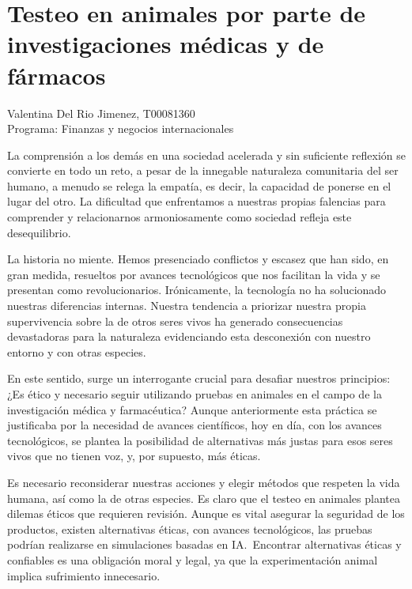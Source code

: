\documentclass[letterpaper, 12pt]{report}
\begin{document}
\chapter*{Testeo en animales por parte de investigaciones médicas y de fármacos}

\noindent\makebox[\linewidth]{\rule{\textwidth}{0.4pt}}

\noindent
Valentina Del Rio Jimenez, T00081360 \\
Programa: Finanzas y negocios internacionales

\noindent\makebox[\linewidth]{\rule{\textwidth}{0.4pt}}

\nocite{*}

La comprensión a los demás en una sociedad acelerada y sin suficiente reflexión
se convierte en todo un reto, a pesar de la innegable naturaleza comunitaria
del ser humano, a menudo se relega la empatía, es decir, la capacidad de
ponerse en el lugar del otro. La dificultad que enfrentamos a nuestras propias
falencias para comprender y relacionarnos armoniosamente como sociedad refleja
este desequilibrio.

La historia no miente. Hemos presenciado conflictos y escasez que han sido,
en gran medida, resueltos por avances tecnológicos que nos facilitan la vida
y se presentan como revolucionarios. Irónicamente, la tecnología no ha
solucionado nuestras diferencias internas. Nuestra tendencia a priorizar
nuestra propia supervivencia sobre la de otros seres vivos ha generado
consecuencias devastadoras para la naturaleza evidenciando esta desconexión
con nuestro entorno y con otras especies.

En este sentido, surge un interrogante crucial para desafiar nuestros
principios: ¿Es ético y necesario seguir utilizando pruebas en animales
en el campo de la investigación médica y farmacéutica? Aunque anteriormente
esta práctica se justificaba por la necesidad de avances científicos, hoy en
día, con los avances tecnológicos, se plantea la posibilidad de alternativas
más justas para esos seres vivos que no tienen voz, y, por supuesto, más
éticas.

Es necesario reconsiderar nuestras acciones y elegir métodos que respeten
la vida humana, así como la de otras especies. Es claro que el testeo en
animales plantea dilemas éticos que requieren revisión. Aunque es vital
asegurar la seguridad de los productos, existen alternativas éticas, con
avances tecnológicos, las pruebas podrían realizarse en simulaciones basadas
en IA.~Encontrar alternativas éticas y confiables es una obligación moral y
legal, ya que la experimentación animal implica sufrimiento innecesario.
\end{document}
